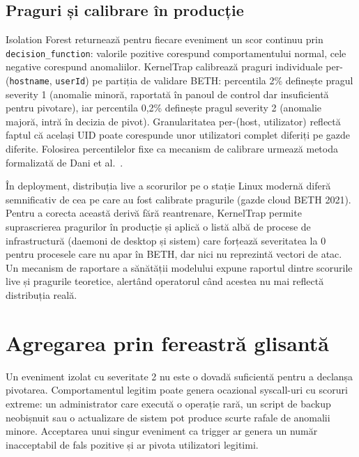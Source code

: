 \subsection{Praguri și calibrare în producție}

Isolation Forest returnează pentru fiecare eveniment un scor continuu prin\linebreak
\texttt{decision\_function}: valorile pozitive corespund comportamentului normal, cele negative
corespund anomaliilor. KernelTrap calibrează praguri individuale per-(\texttt{hostname}, \texttt{userId})
pe partiția de validare BETH: percentila 2\% definește pragul severity 1 (anomalie minoră,
raportată în panoul de control dar insuficientă pentru pivotare), iar percentila 0,2\% definește
pragul severity 2 (anomalie majoră, intră în decizia de pivot). Granularitatea per-(host,
utilizator) reflectă faptul că același UID poate corespunde unor utilizatori complet diferiți
pe gazde diferite. Folosirea percentilelor fixe ca mecanism de calibrare urmează metoda
formalizată de Dani et al.~\cite{dani2016adaptive}.

În deployment, distribuția live a scorurilor pe o stație Linux modernă diferă semnificativ
de cea pe care au fost calibrate pragurile (gazde cloud BETH 2021). Pentru a corecta această
derivă fără reantrenare, KernelTrap permite suprascrierea pragurilor în producție și aplică o
listă albă de procese de infrastructură (daemoni de desktop și sistem) care forțează
severitatea la 0 pentru procesele care nu apar în BETH, dar nici nu reprezintă vectori de
atac. Un mecanism de raportare a sănătății modelului expune raportul dintre scorurile live și
pragurile teoretice, alertând operatorul când acestea nu mai reflectă distribuția reală.

\section{Agregarea prin fereastră glisantă}

Un eveniment izolat cu severitate 2 nu este o dovadă suficientă pentru a declanșa pivotarea.
Comportamentul legitim poate genera ocazional syscall-uri cu scoruri extreme: un administrator
care execută o operație rară, un script de backup neobișnuit sau o actualizare de sistem pot
produce scurte rafale de anomalii minore. Acceptarea unui singur eveniment ca trigger ar genera
un număr inacceptabil de fals pozitive și ar pivota utilizatori legitimi.

